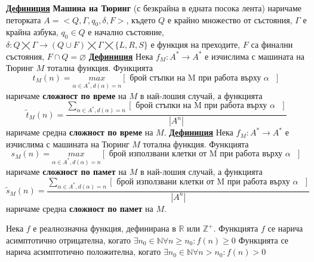 \documentclass{article}
\begin{document}
\textbf{\underline{Дефиниция}}
\textbf{Машина на Тюринг} (с безкрайна в едната посока лента) наричаме петорката $A = <Q, \Gamma, q_0, \delta, F>$, където
$Q$ е крайно множество от състояния, $\Gamma$ е крайна азбука, $q_0 \in Q$ е начално състояние,
$\delta : Q \bigtimes \Gamma \rightarrow (Q \cup F) \bigtimes \Gamma \bigtimes \{L, R, S\}$ е функция на преходите,
$F$ са финални състояния, $F \cap Q = \varnothing$ \newline\newline
\textbf{\underline{Дефиниция}}
Нека $f_M : A^* \rightarrow A^*$ е изчислима с машината на Тюринг $M$ тотална функция. Функцията
$$t_M(n) = \underset{\alpha \in A^*, d(\alpha) = n}{max} [\text{ брой стъпки на M при работа върху $\alpha$ }]$$
наричаме \textbf{сложност по време} на $M$ в най-лошия случай, а функцията
$$\tilde{t}_M(n) = \frac{\sum_{\alpha \in A^*, d(\alpha) = n} [\text{ брой стъпки на M при работа върху $\alpha$ }]}{|A^n|}$$
наричаме средна \textbf{сложност по време} на $M$. \newline\newline
\textbf{\underline{Дефиниция}}
Нека $f_M : A^* \rightarrow A^*$ е изчислима с машината на Тюринг $M$ тотална функция. Функцията
$$s_M(n) = \underset{\alpha \in A^*, d(\alpha) = n}{max} [\text{ брой използвани клетки от M при работа върху $\alpha$ }]$$
наричаме \textbf{сложност по памет} на $M$ в най-лошия случай, а функцията
$$\tilde{s}_M(n) = \frac{\sum_{\alpha \in A^*, d(\alpha) = n} [\text{ брой използвани клетки от M при работа върху $\alpha$ }]}{|A^n|}$$
наричаме средна \textbf{сложност по памет} на $M$.

Нека $f$ е реалнозначна функция, дефинирана в $\mathbb{R}$ или $\mathbb{Z^+}$.
Функцията $f$ се нарича асимптотично отрицателна, когато $\exists n_0 \in \mathbb{N} \forall n \ge n_0 : f(n) \ge 0$
Функцията се нарича асимптотично положителна, когато $\exists n_0 \in \mathbb{N} \forall n > n_0 : f(n) > 0$
\end{document}
